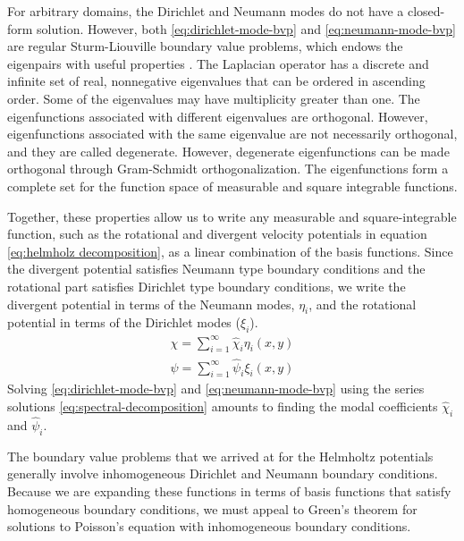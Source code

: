 \documentclass[draft]{agujournal2019}
\begin{document}
For arbitrary domains, the Dirichlet and Neumann modes do not have a closed-form solution. However, both \eqref{eq:dirichlet-mode-bvp} and \eqref{eq:neumann-mode-bvp} are regular Sturm-Liouville boundary value problems, which endows the eigenpairs with useful properties \cite{Grebenkov_2013}.  The Laplacian operator has a discrete and infinite set of real, nonnegative eigenvalues that can be ordered in ascending order. Some of the eigenvalues may have multiplicity greater than one. The eigenfunctions associated with different eigenvalues are orthogonal. However, eigenfunctions associated with the same eigenvalue are not necessarily orthogonal, and they are called degenerate. However, degenerate eigenfunctions can be made orthogonal through Gram-Schmidt orthogonalization. The eigenfunctions form a complete set for the function space of measurable and square integrable functions. 

Together, these properties allow us to write any measurable and square-integrable function, such as the rotational and divergent velocity potentials in equation \eqref{eq:helmholz decomposition},  as a linear combination of the basis functions. Since the divergent potential satisfies Neumann type boundary conditions and the rotational part satisfies Dirichlet type boundary conditions, we write the divergent potential in terms of the Neumann modes, $\eta_i$,  and the rotational potential in terms of the Dirichlet modes ($\xi_i$).
\begin{subequations}
    \begin{align}
        \chi = \sum_{i=1}^{\infty} \hat{\chi}_i \eta_i(x,y) \\
        \psi = \sum_{i=1}^{\infty} \hat{\psi}_i \xi_i(x,y)
    \end{align} \label{eq:spectral-decomposition}
\end{subequations}
Solving \eqref{eq:dirichlet-mode-bvp} and \eqref{eq:neumann-mode-bvp} using the series solutions \eqref{eq:spectral-decomposition} amounts to finding the modal coefficients $\hat{\chi}_i$ and $\hat{\psi}_i$. 

The boundary value problems that we arrived at for the Helmholtz potentials generally involve inhomogeneous Dirichlet and Neumann boundary conditions. Because we are expanding these functions in terms of basis functions that satisfy homogeneous boundary conditions, we must appeal to Green's theorem for solutions to Poisson's equation with inhomogeneous boundary conditions.
\end{document}
